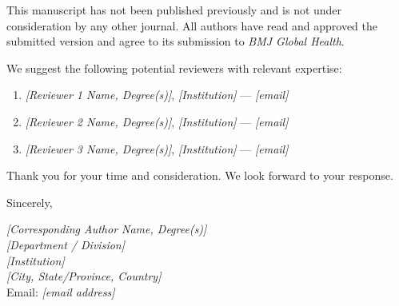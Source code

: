 \documentclass[11pt]{article}
\begin{document}
This manuscript has not been published previously and is not under consideration by any other journal. All authors have read and approved the submitted version and agree to its submission to \textit{BMJ Global Health}.

We suggest the following potential reviewers with relevant expertise:

\begin{enumerate}
    \item \textit{[Reviewer 1 Name, Degree(s)]}, \textit{[Institution]} --- \textit{[email]}
    \item \textit{[Reviewer 2 Name, Degree(s)]}, \textit{[Institution]} --- \textit{[email]}
    \item \textit{[Reviewer 3 Name, Degree(s)]}, \textit{[Institution]} --- \textit{[email]}
\end{enumerate}

Thank you for your time and consideration. We look forward to your response.

\vspace{0.5em}

Sincerely,

\vspace{1.5em}

\textit{[Corresponding Author Name, Degree(s)]}\\
\textit{[Department / Division]}\\
\textit{[Institution]}\\
\textit{[City, State/Province, Country]}\\
Email: \textit{[email address]}
\end{document}
